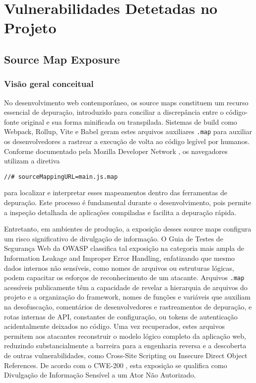 \section{Vulnerabilidades Detetadas no Projeto}
\label{sec:vulnerabilidades-detetadas}

\subsection{Source Map Exposure}
\label{subsec:source-map-explosure}

\subsubsection{Visão geral conceitual}
\label{subsubsec:visao-geral-SME}

No desenvolvimento web contemporâneo, os source maps constituem um recurso essencial de depuração, introduzido para conciliar a discrepância entre o código-fonte original e sua forma minificada ou transpilada. Sistemas de build como Webpack, Rollup, Vite e Babel geram estes arquivos auxiliares \texttt{.map} para auxiliar os desenvolvedores a rastrear a execução de volta ao código legível por humanos. Conforme documentado pela Mozilla Developer Network \cite{ref42}, os navegadores utilizam a diretiva  

\begin{verbatim}
//# sourceMappingURL=main.js.map
\end{verbatim}

para localizar e interpretar esses mapeamentos dentro das ferramentas de depuração. Este processo é fundamental durante o desenvolvimento, pois permite a inspeção detalhada de aplicações compiladas e facilita a depuração rápida. 

Entretanto, em ambientes de produção, a exposição desses source maps configura um risco significativo de divulgação de informação. O Guia de Testes de Segurança Web da OWASP \cite{ref2} classifica tal exposição na categoria mais ampla de Information Leakage and Improper Error Handling, enfatizando que mesmo dados internos não sensíveis, como nomes de arquivos ou estruturas lógicas, podem capacitar os esforços de reconhecimento de um atacante. Arquivos \texttt{.map} acessíveis publicamente têm a capacidade de revelar a hierarquia de arquivos do projeto e a organização do framework, nomes de funções e variáveis que auxiliam na desofuscação, comentários de desenvolvedores e rastreamentos de depuração, e rotas internas de API, constantes de configuração, ou tokens de autenticação acidentalmente deixados no código. Uma vez recuperados, estes arquivos permitem aos atacantes reconstruir o modelo lógico completo da aplicação web, reduzindo substancialmente a barreira para a engenharia reversa e a descoberta de outras vulnerabilidades, como Cross-Site Scripting ou Insecure Direct Object References. De acordo com o CWE-200 \cite{ref43}, esta exposição se qualifica como Divulgação de Informação Sensível a um Ator Não Autorizado. 

